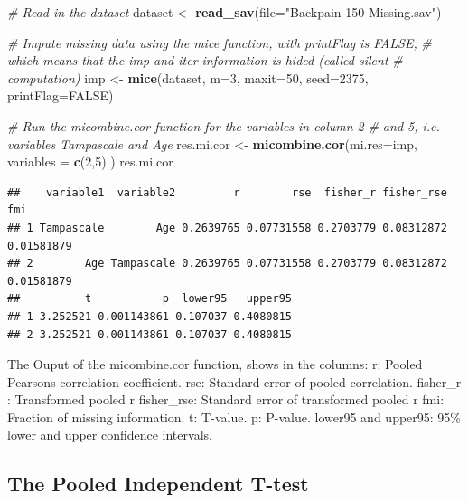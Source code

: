 \documentclass[
]{book}
\newenvironment{Shaded}{\begin{snugshade}}{\end{snugshade}}
\newcommand{\CommentTok}[1]{\textcolor[rgb]{0.56,0.35,0.01}{\textit{#1}}}
\newcommand{\DataTypeTok}[1]{\textcolor[rgb]{0.13,0.29,0.53}{#1}}
\newcommand{\DecValTok}[1]{\textcolor[rgb]{0.00,0.00,0.81}{#1}}
\newcommand{\KeywordTok}[1]{\textcolor[rgb]{0.13,0.29,0.53}{\textbf{#1}}}
\newcommand{\NormalTok}[1]{#1}
\newcommand{\OtherTok}[1]{\textcolor[rgb]{0.56,0.35,0.01}{#1}}
\newcommand{\StringTok}[1]{\textcolor[rgb]{0.31,0.60,0.02}{#1}}
\begin{document}
\begin{Shaded}
\begin{Highlighting}[]
\CommentTok{# Read in the dataset }
\NormalTok{dataset <-}\StringTok{ }\KeywordTok{read_sav}\NormalTok{(}\DataTypeTok{file=}\StringTok{"Backpain 150 Missing.sav"}\NormalTok{)}

\CommentTok{# Impute missing data using the mice function, with printFlag is FALSE, }
\CommentTok{# which means that the imp and iter information is hided (called silent }
\CommentTok{# computation)}
\NormalTok{imp <-}\StringTok{ }\KeywordTok{mice}\NormalTok{(dataset, }\DataTypeTok{m=}\DecValTok{3}\NormalTok{, }\DataTypeTok{maxit=}\DecValTok{50}\NormalTok{, }\DataTypeTok{seed=}\DecValTok{2375}\NormalTok{, }\DataTypeTok{printFlag=}\OtherTok{FALSE}\NormalTok{)}

\CommentTok{# Run the micombine.cor function for the variables in column 2 }
\CommentTok{# and 5, i.e. variables Tampascale and Age}
\NormalTok{res.mi.cor <-}\StringTok{ }\KeywordTok{micombine.cor}\NormalTok{(}\DataTypeTok{mi.res=}\NormalTok{imp, }\DataTypeTok{variables =} \KeywordTok{c}\NormalTok{(}\DecValTok{2}\NormalTok{,}\DecValTok{5}\NormalTok{) )}
\NormalTok{res.mi.cor}
\end{Highlighting}
\end{Shaded}

\begin{verbatim}
##    variable1  variable2         r        rse  fisher_r fisher_rse        fmi
## 1 Tampascale        Age 0.2639765 0.07731558 0.2703779 0.08312872 0.01581879
## 2        Age Tampascale 0.2639765 0.07731558 0.2703779 0.08312872 0.01581879
##          t           p  lower95   upper95
## 1 3.252521 0.001143861 0.107037 0.4080815
## 2 3.252521 0.001143861 0.107037 0.4080815
\end{verbatim}

The Ouput of the micombine.cor function, shows in the columns: r: Pooled
Pearsons correlation coefficient. rse: Standard error of pooled
correlation. fisher\_r : Transformed pooled r fisher\_rse: Standard
error of transformed pooled r fmi: Fraction of missing information. t:
T-value. p: P-value. lower95 and upper95: 95\% lower and upper
confidence intervals.

\hypertarget{the-pooled-independent-t-test}{%
\subsection{The Pooled Independent
T-test}\label{the-pooled-independent-t-test}}
\end{document}

